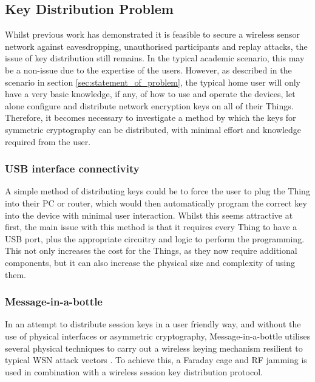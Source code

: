 \documentclass{mprop}
\begin{document}
\subsection{Key Distribution Problem} %
\label{sub:key_distribution_problem}

Whilst previous work has demonstrated it is feasible to secure a wireless sensor network against eavesdropping, unauthorised participants and replay attacks, the issue of key distribution still remains.
In the typical academic scenario, this may be a non-issue due to the expertise of the users. However, as described in the scenario in section \ref{sec:statement_of_problem}, the typical home user will only have a very basic knowledge, if any, of how to use and operate the devices, let alone configure and distribute network encryption keys on all of their Things. Therefore, it becomes necessary to investigate a method by which the keys for symmetric cryptography can be distributed, with minimal effort and knowledge required from the user.

\subsubsection{USB interface connectivity} %
\label{ssub:usb_interface_connectivity}
A simple method of distributing keys could be to force the user to plug the Thing into their PC or router, which would then automatically program the correct key into the device with minimal user interaction. Whilst this seems attractive at first, the main issue with this method is that it requires every Thing to have a USB port, plus the appropriate circuitry and logic to perform the programming. This not only increases the cost for the Things, as they now require additional components, but it can also increase the physical size and complexity of using them.

\subsubsection{Message-in-a-bottle} %
\label{ssub:message_in_a_bottle}
In an attempt to distribute session keys in a user friendly way, and without the use of physical interfaces or asymmetric cryptography, Message-in-a-bottle utilises several physical techniques to carry out a wireless keying mechanism resilient to typical WSN attack vectors \cite{MessageBottle}. To achieve this, a Faraday cage and RF jamming is used in combination with a wireless session key distribution protocol. 
\end{document}
